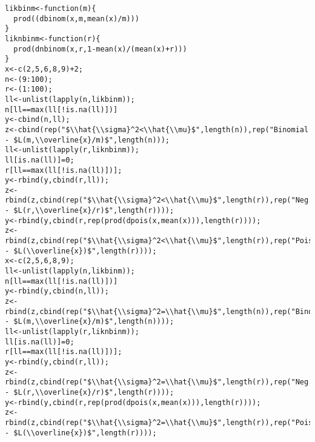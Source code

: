 \documentclass[]{book}
\theoremstyle{definition}
\theoremstyle{definition}
\theoremstyle{definition}
\theoremstyle{remark}
\begin{document}
\hypertarget{toggleCodeFreq.2}{}
\begin{verbatim}
likbinm<-function(m){
  prod((dbinom(x,m,mean(x)/m)))
}
liknbinm<-function(r){
  prod(dnbinom(x,r,1-mean(x)/(mean(x)+r)))
}
x<-c(2,5,6,8,9)+2;
n<-(9:100);
r<-(1:100);
ll<-unlist(lapply(n,likbinm));
n[ll==max(ll[!is.na(ll)])]
y<-cbind(n,ll);
z<-cbind(rep("$\\hat{\\sigma}^2<\\hat{\\mu}$",length(n)),rep("Binomial - $L(m,\\overline{x}/m)$",length(n)));
ll<-unlist(lapply(r,liknbinm));
ll[is.na(ll)]=0;
r[ll==max(ll[!is.na(ll)])];
y<-rbind(y,cbind(r,ll));
z<-rbind(z,cbind(rep("$\\hat{\\sigma}^2<\\hat{\\mu}$",length(r)),rep("Neg.Binomial - $L(r,\\overline{x}/r)$",length(r))));
y<-rbind(y,cbind(r,rep(prod(dpois(x,mean(x))),length(r))));
z<-rbind(z,cbind(rep("$\\hat{\\sigma}^2<\\hat{\\mu}$",length(r)),rep("Poisson - $L(\\overline{x})$",length(r))));
x<-c(2,5,6,8,9);
ll<-unlist(lapply(n,likbinm));
n[ll==max(ll[!is.na(ll)])]
y<-rbind(y,cbind(n,ll));
z<-rbind(z,cbind(rep("$\\hat{\\sigma}^2=\\hat{\\mu}$",length(n)),rep("Binomial - $L(m,\\overline{x}/m)$",length(n))));
ll<-unlist(lapply(r,liknbinm));
ll[is.na(ll)]=0;
r[ll==max(ll[!is.na(ll)])];
y<-rbind(y,cbind(r,ll));
z<-rbind(z,cbind(rep("$\\hat{\\sigma}^2=\\hat{\\mu}$",length(r)),rep("Neg.Binomial - $L(r,\\overline{x}/r)$",length(r))));
y<-rbind(y,cbind(r,rep(prod(dpois(x,mean(x))),length(r))));
z<-rbind(z,cbind(rep("$\\hat{\\sigma}^2=\\hat{\\mu}$",length(r)),rep("Poisson - $L(\\overline{x})$",length(r))));

\end{verbatim}
\end{document}
